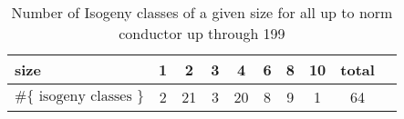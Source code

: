 \documentclass{amsart}
\begin{document}
\begin{center}
\begin{table}[h]
\caption{Number of Isogeny classes of a given size for all up to norm conductor up through 199\label{table:counts}}
\begin{tabular}{|l|c|c|c|c|c|c|c|c|c|}\hline
size                           & 1 & 2  & 3 & 4  & 6 & 8 & 10 & total \\ \hline
$\#\{\text{ isogeny classes }\}$ & 2 & 21 & 3 & 20 & 8 & 9 & 1  & 64 \\\hline
\end{tabular}
\end{table}
\end{center}



\end{document}
